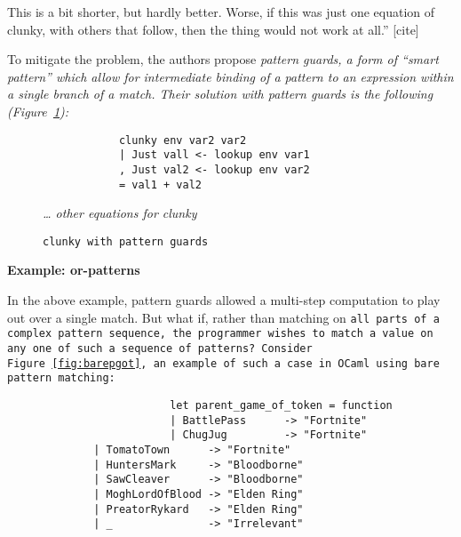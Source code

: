 \documentclass[manuscript,screen,review, 12pt]{acmart}
\begin{document}
\begin{outline}[enumerate]
        This is a bit shorter, but hardly better. Worse, if this was just one
        equation of clunky, with others that follow, then the thing would not
        work at all.” [cite]
        
        To mitigate the problem, the authors propose \it{pattern guards}, a form
        of “smart pattern” which allow for intermediate binding of a pattern to
        an expression within a single branch of a match. Their solution with
        pattern guards is the following (Figure~\ref{fig:guardclunky}): 

    \begin{figure}[hbt!]  
        \begin{center}
        \begin{verbatim}
            clunky env var2 var2    
            | Just vall <- lookup env var1
            , Just val2 <- lookup env var2
            = val1 + val2
        \end{verbatim}
        \it{… other equations for clunky}
        \end{center}    
    
    \caption{\tt{clunky} with pattern guards} 
    \label{fig:guardclunky}
    \end{figure}
        
         \bf{Example: or-patterns}

        In the above example, pattern guards allowed a multi-step computation to
        play out over a single match. But what if, rather than matching on
        \tt{all} parts of a complex pattern sequence, the programmer wishes to
        match a value on \tt{any one} of such a sequence of patterns? Consider
        Figure~\ref{fig:barepgot}, an example of such a case in OCaml using bare
        pattern matching: 
       
        \begin{figure}
            \begin{center}
                \begin{verbatim}
                    let parent_game_of_token = function 
                    | BattlePass      -> "Fortnite"
                    | ChugJug         -> "Fortnite"
        | TomatoTown      -> "Fortnite"
        | HuntersMark     -> "Bloodborne"
        | SawCleaver      -> "Bloodborne"
        | MoghLordOfBlood -> "Elden Ring"
        | PreatorRykard   -> "Elden Ring"
        | _               -> "Irrelevant"
                \end{verbatim}
            \end{center}    


\end{figure}
\end{outline}
\end{document}
